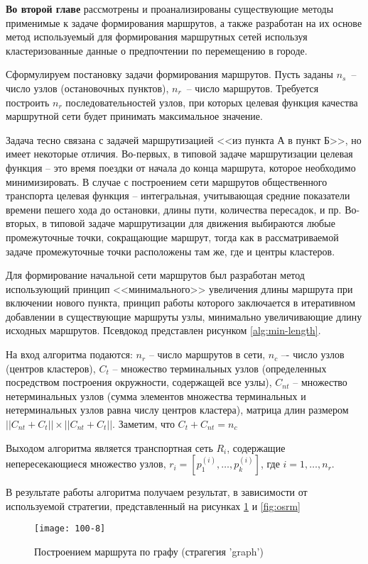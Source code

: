 \textbf{Во второй главе} рассмотрены и проанализированы существующие методы применимые к задаче формирования 
маршрутов, а также разработан на их основе метод используемый для формирования маршрутных сетей используя 
кластеризованные данные о предпочтении по перемещению в городе.

Сформулируем постановку задачи формирования маршрутов. Пусть заданы \( n_s \)~-- число узлов (остановочных 
пунктов), \( n_r \)~-- число маршрутов. Требуется построить \( n_r \) последовательностей узлов, при которых 
целевая функция качества маршрутной сети будет принимать максимальное значение. 

Задача тесно связана с задачей маршрутизацией <<из пункта А в пункт Б>>, но имеет некоторые отличия. 
Во-первых, в типовой задаче маршрутизации целевая функция -- это время поездки от начала до конца маршрута, 
которое необходимо минимизировать. В случае с построением сети маршрутов общественного транспорта целевая 
функция -- интегральная, учитывающая средние показатели времени пешего хода до остановки, длины пути, 
количества пересадок, и пр. Во-вторых, в типовой задаче маршрутизации для движения выбираются любые 
промежуточные точки, сокращающие маршрут, тогда как в рассматриваемой задаче промежуточные точки 
расположены там же, где и центры кластеров.

Для формирование начальной сети маршрутов был разработан метод использующий принцип <<минимального>> 
увеличения длины маршрута при включении нового пункта, принцип работы которого заключается в итеративном 
добавлении в существующие маршруты узлы, минимально увеличивающие длину исходных маршрутов. Псевдокод 
представлен рисунком \ref{alg:min-length}.

На вход алгоритма подаются: \( n_r \) -- число маршрутов в сети, \( n_c \) –- число узлов (центров 
кластеров), \( C_t \) -- множество терминальных узлов (определенных посредством построения окружности, 
содержащей все узлы), \( C_{nt} \) -- множество нетерминальных узлов (сумма элементов множества терминальных 
и нетерминальных узлов равна числу центров кластера), матрица длин размером 
\( ||{C_{nt}} + {C_{t}}|| \times ||{C_{nt}} + {C_{t}}|| \). Заметим, что \( C_t + C_{nt} = n_c \)

Выходом алгоритма является транспортная сеть \( R_i \), содержащие непересекающиеся множество узлов, 
\( r_{i} = [p_{1}^{(i)}, \dots, p_{k}^{(i)}] \), где \( i = 1, \dots, n_r \). 

В результате работы алгоритма получаем результат, в зависимости от используемой стратегии, представленный на 
рисунках \ref{fig:graph} и \ref{fig:osrm}
\begin{figure}[ht!]
    \centering
    \texttt{[image: 100-8]}
    \caption{Построением маршрута по графу (страгегия 'graph')}
    \label{fig:graph}
\end{figure}

